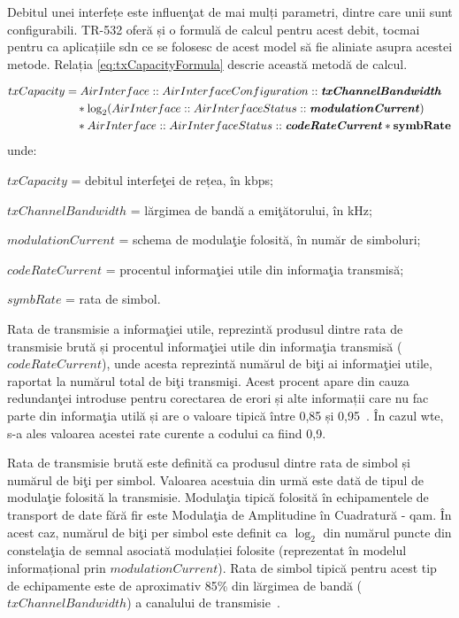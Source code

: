 Debitul unei interfețe este influenţat de mai mulți parametri, dintre care unii sunt configurabili. TR-532 \cite{onftr532} oferă și o formulă de calcul pentru acest debit, tocmai pentru ca aplicațiile \gls{sdn} ce se folosesc de acest model să fie aliniate asupra acestei metode. Relația \ref{eq:txCapacityFormula} descrie această metodă de calcul.

\begin{equation}\label{eq:txCapacityFormula}
\begin{split}
txCapacity& =AirInterface::AirInterfaceConfiguration::\textbf{\textit{txChannelBandwidth}}\\
& \quad * \log_{2}(AirInterface::AirInterfaceStatus::\textbf{\textit{modulationCurrent}})\\
& \quad * AirInterface::AirInterfaceStatus::\textbf{\textit{codeRateCurrent}} * \textbf{symbRate}
\end{split}
\end{equation}
unde:

$txCapacity$ = debitul interfeţei de rețea, în kbps;

$txChannelBandwidth$ = lărgimea de bandă a emiţătorului, în kHz;

$modulationCurrent$ = schema de modulaţie folosită, în număr de simboluri;

$codeRateCurrent$ = procentul informaţiei utile din informaţia transmisă;

$symbRate$ = rata de simbol.

Rata de transmisie a informaţiei utile, reprezintă produsul dintre rata de transmisie brută și procentul informaţiei utile din informaţia transmisă ($codeRateCurrent$), unde acesta reprezintă numărul de biţi ai informaţiei utile, raportat la numărul total de biţi transmişi. Acest procent apare din cauza redundanţei introduse pentru corectarea de erori și alte informații care nu fac parte din informaţia utilă și are o valoare tipică între 0,85 și 0,95~\cite{kizer2013digital}. În cazul \gls{wte}, s-a ales valoarea acestei rate curente a codului ca fiind 0,9.

Rata de transmisie brută este definită ca produsul dintre rata de simbol și numărul de biţi per simbol. Valoarea acestuia din urmă este dată de tipul de modulaţie folosită la transmisie. Modulaţia tipică folosită în echipamentele de transport de date fără fir este Modulaţia de Amplitudine în Cuadratură - \gls{qam}. În acest caz, numărul de biţi per simbol este definit ca $\log_{2}$ din numărul puncte din constelaţia de semnal asociată modulației folosite (reprezentat în modelul informațional prin $modulationCurrent$). Rata de simbol tipică pentru acest tip de echipamente este de aproximativ 85\% din lărgimea de bandă ($txChannelBandwidth$) a canalului de transmisie~\cite{kizer2013digital}.

